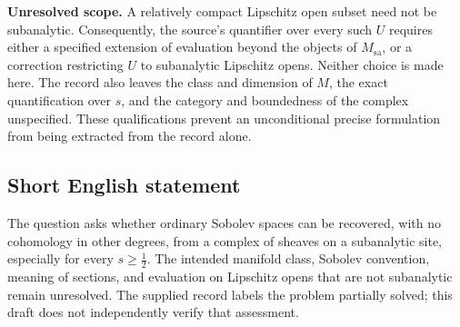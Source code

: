 \documentclass[11pt]{article}
\begin{document}
\textbf{Unresolved scope.} A relatively compact Lipschitz open subset need not be subanalytic. Consequently, the source's quantifier over every such \(U\) requires either a specified extension of evaluation beyond the objects of \(M_{\mathrm{sa}}\), or a correction restricting \(U\) to subanalytic Lipschitz opens. Neither choice is made here. The record also leaves the class and dimension of \(M\), the exact quantification over \(s\), and the category and boundedness of the complex unspecified. These qualifications prevent an unconditional precise formulation from being extracted from the record alone.
\subsection{Short English statement}
The question asks whether ordinary Sobolev spaces can be recovered, with no cohomology in other degrees, from a complex of sheaves on a subanalytic site, especially for every \(s\geq\tfrac12\). The intended manifold class, Sobolev convention, meaning of sections, and evaluation on Lipschitz opens that are not subanalytic remain unresolved. The supplied record labels the problem partially solved; this draft does not independently verify that assessment.
\end{document}
